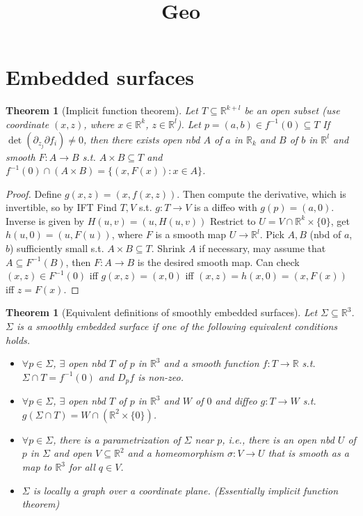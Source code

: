 \documentclass{article}
\title{Geo}
\author{ }
\date{ }
\theoremstyle{definition}
\theoremstyle{remark}
\theoremstyle{plain}
\newtheorem{thm}[defn]{Theorem}
\theoremstyle{definition}
\newcommand{\RR}{\mathbb{R}}
\begin{document}
\maketitle
\section{Embedded surfaces}
\begin{thm}[Implicit function theorem]
    Let $T\subseteq\RR^{k+l}$ be an open subset (use coordinate $(x,z)$, where $x\in\RR^k$, $z\in\RR^l$). Let $p=(a,b)\in f^{-1}(0)\subseteq T$ If $\det(\partial_{z_j}\partial f_i)\neq 0$, then there exists open nbd $A$ of $a$ in $\RR_k$ and $B$ of $b$ in $\RR^l$ and smooth $F:A\to B$ s.t. $A\times B\subseteq T$ and $f^{-1}(0)\cap(A\times B)=\{(x,F(x)):x\in A\}$.
\end{thm}
\begin{proof}
    Define $g(x,z)=(x,f(x,z))$. Then compute the derivative, which is invertible, so by IFT Find $T, V$ s.t. $g:T\to V$ is a diffeo with $g(p)=(a,0)$. Inverse is given by $H(u,v)=(u,H(u,v))$ Restrict to $U=V\cap \RR^k\times\{0\}$, get $h(u,0)=(u,F(u))$, where $F$ is a smooth map $U\to \RR^l$. Pick $A,B$ (nbd of $a$, $b$) sufficiently small s.t. $A\times B\subseteq T$. Shrink $A$ if necessary, may assume that $A\subseteq F^{-1}(B)$, then $F:A\to B$ is the desired smooth map. Can check $(x,z)\in F^{-1}(0)$ iff $g(x,z)=(x,0)$ iff $(x,z)=h(x,0)=(x,F(x))$ iff $z=F(x)$.
\end{proof}
\begin{thm}[Equivalent definitions of smoothly embedded surfaces]
Let $\Sigma\subseteq\RR^3$. $\Sigma$ is a smoothly embedded surface if one of the following equivalent conditions holds.\\
\begin{itemize}
    \item $\forall p\in\Sigma$, $\exists$ open nbd $T$ of $p$ in $\RR^3$ and a smooth function $f:T\to\RR$ s.t. $\Sigma\cap T=f^{-1}(0)$ and $D_pf$ is non-zeo.
    \item $\forall p\in\Sigma$, $\exists$ open nbd $T$ of $p$ in $\RR^3$ and $W$ of $0$ and diffeo $g:T\to W$ s.t. $g(\Sigma\cap T)=W\cap(\RR^2\times\{0\})$.
    \item $\forall p\in \Sigma$, there is a parametrization of $\Sigma$ near $p$, i.e., there is an open nbd $U$ of $p$ in $\Sigma$ and open $V\subseteq\RR^2$ and a homeomorphism $\sigma:V\to U$ that is smooth as a map to $\RR^3$ for all $q\in V$.
    \item $\Sigma$ is locally a graph over a coordinate plane. (Essentially implicit function theorem)
\end{itemize}
\end{thm}
\end{document}
